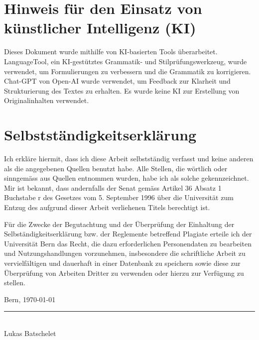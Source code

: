 \documentclass{template}
\begin{document}
\clearpage



\clearpage



\clearpage



\clearpage



\newpage
\printglossary


\newpage
{}
\printbibliography[heading=bibintoc]

\newpage

\section*{Hinweis für den Einsatz von künstlicher Intelligenz (KI)}

Dieses Dokument wurde mithilfe von KI-basierten Tools überarbeitet. LanguageTool, ein KI-gestütztes Grammatik- und Stilprüfungswerkzeug, wurde verwendet, um Formulierungen zu verbessern und die Grammatik zu korrigieren. Chat-GPT von Open-AI wurde verwendet, um Feedback zur Klarheit und Strukturierung des Textes zu erhalten. Es wurde keine KI zur Erstellung von Originalinhalten verwendet.


\newpage

\section*{Selbstständigkeitserklärung}

Ich erkläre hiermit, dass ich diese Arbeit selbstständig verfasst und keine anderen als die angegebenen Quellen benutzt habe. Alle Stellen, die wörtlich oder sinngemäss aus Quellen entnommen wurden, habe ich als solche gekennzeichnet. Mir ist bekannt, dass andernfalls der Senat gemäss Artikel 36 Absatz 1 Buchstabe r des Gesetzes vom 5. September 1996 über die Universität zum Entzug des aufgrund dieser Arbeit verliehenen Titels berechtigt ist.

Für die Zwecke der Begutachtung und der Überprüfung der Einhaltung der Selbständigkeitserklärung bzw. der Reglemente betreffend Plagiate erteile ich der Universität Bern das Recht, die dazu erforderlichen Personendaten zu bearbeiten und Nutzungshandlungen vorzunehmen, insbesondere die schriftliche Arbeit zu vervielfältigen und dauerhaft in einer Datenbank zu speichern sowie diese zur Überprüfung von Arbeiten Dritter zu verwenden oder hierzu zur Verfügung zu stellen.

\vspace{8cm}

\noindent Bern, \today

\vspace{2cm}

\noindent\rule{6cm}{0.4pt} \\
\noindent Lukas Batschelet




\clearpage
{}
   
   
\end{document}
